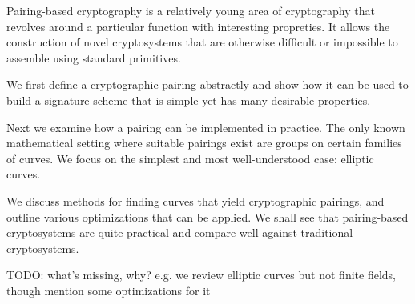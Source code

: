 \beforepreface
{}
Pairing-based cryptography is a relatively young area of cryptography that
revolves around a particular function with interesting propreties.
It allows the construction of novel cryptosystems that are otherwise
difficult or impossible to assemble using standard primitives.

We first define a cryptographic pairing abstractly and show how it
can be used to build a signature scheme that is simple yet has many
desirable properties.

Next we examine how a pairing can be implemented in practice. The only known
mathematical setting where suitable pairings exist are groups on certain
families of curves. We focus on the simplest and most well-understood case:
elliptic curves.

We discuss methods for finding curves that yield cryptographic pairings,
and outline various optimizations that can be applied. We shall see that
pairing-based cryptosystems are quite practical and compare well against
traditional cryptosystems.

TODO: what's missing, why? e.g. we review elliptic curves but not finite fields,
though mention some optimizations for it
